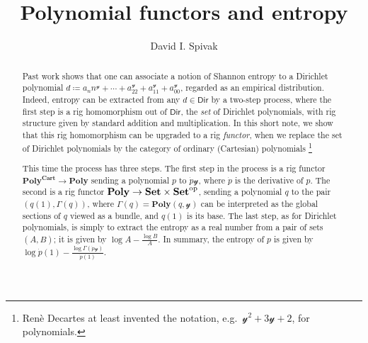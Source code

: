 \documentclass[11pt, one side, article]{memoir}
\theoremstyle{definition}
\theoremstyle{plain}
\newcommand{\Set}[1]{\mathsf{#1}}%
\newcommand{\Cat}[1]{\mathbf{#1}}%
\newcommand{\op}{^\tn{op}}
\newcommand{\tn}[1]{\textnormal{#1}}
\newcommand{\smset}{\Cat{Set}}
\newcommand{\yon}{\mathcal{y}}
\newcommand{\poly}{\Cat{Poly}}
\newcommand{\dir}{\Set{Dir}}
\newcommand{\polycart}{\poly^{\Cat{Cart}}}
\newcommand{\0}{\textsf{0}}
\newcommand{\1}{\tn{\textsf{1}}}
\begin{document}
\title{Polynomial functors and entropy}

\author{David I. Spivak}

\date{\vspace{-.2in}}

\maketitle

\begin{abstract}
Past work shows that one can associate a notion of Shannon entropy to a Dirichlet polynomial $d\coloneqq a_nn^\yon+\cdots+a_22^\yon+a_11^\yon+a_00^\yon$, regarded as an empirical distribution. Indeed, entropy can be extracted from any $d\in\dir$ by a two-step process, where the first step is a rig homomorphism out of $\dir$, the \emph{set} of Dirichlet polynomials, with rig structure given by standard addition and multiplication. In this short note, we show that this rig homomorphism can be upgraded to a rig \emph{functor}, when we replace the set of Dirichlet polynomials by the category of ordinary (Cartesian) polynomials%
\footnote{Ren\`{e} Decartes at least invented the notation, e.g.\ $\yon^2+3\yon+2$, for polynomials.}

This time the process has three steps. The first step in the process is a rig functor $\polycart\to\poly$ sending a polynomial $p$ to $\dot{p}\yon$, where $\dot{p}$ is the derivative of $p$. The second is a rig functor $\poly\to\smset\times\smset\op$, sending a polynomial $q$ to the pair $(q(1),\Gamma(q))$, where $\Gamma(q)=\poly(q,\yon)$ can be interpreted as the global sections of $q$ viewed as a bundle, and $q(1)$ is its base. The last step, as for Dirichlet polynomials, is simply to extract the entropy as a real number from a pair of sets $(A,B)$; it is given by $\log A-\frac{\log B}{A}$. In summary, the entropy of $p$ is given by $\log \dot{p}(1)-\frac{\log\Gamma(\dot{p}\yon)}{\dot{p}(1)}$.
\end{abstract}
\end{document}
